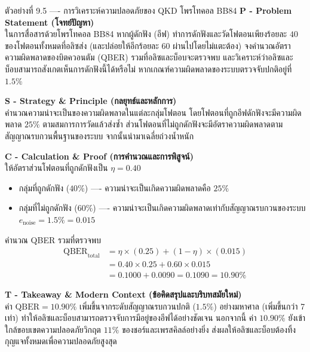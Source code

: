 \begin{psctbox}{ตัวอย่างที่ 9.5 ---- การวิเคราะห์ความปลอดภัยของ QKD โพรโทคอล BB84}
\noindent\textbf{P - Problem Statement (โจทย์ปัญหา)} \\
ในการสื่อสารด้วยโพรโทคอล BB84 หากผู้ดักฟัง (อีฟ) ทำการดักฟังและวัดโฟตอนเพียงร้อยละ $40$ ของโฟตอนทั้งหมดที่อลิซส่ง (และปล่อยให้อีกร้อยละ $60$ ผ่านไปโดยไม่แตะต้อง) จงคำนวณอัตราความผิดพลาดของบิตควอนตัม (QBER) รวมที่อลิซและบ็อบจะตรวจพบ และวิเคราะห์ว่าอลิซและบ็อบสามารถสังเกตเห็นการดักฟังนี้ได้หรือไม่ หากเกณฑ์ความผิดพลาดของระบบตรวจจับปกติอยู่ที่ $1.5\%$

\vspace{4pt}
\noindent\textbf{S - Strategy \& Principle (กลยุทธ์และหลักการ)} \\
คำนวณความน่าจะเป็นของความผิดพลาดในแต่ละกลุ่มโฟตอน โดยโฟตอนที่ถูกอีฟดักฟังจะมีความผิดพลาด $25\%$ ตามสมการการวัดแล้วส่งซ้ำ ส่วนโฟตอนที่ไม่ถูกดักฟังจะมีอัตราความผิดพลาดตามสัญญาณรบกวนพื้นฐานของระบบ จากนั้นนำมาเฉลี่ยถ่วงน้ำหนัก

\vspace{4pt}
\noindent\textbf{C - Calculation \& Proof (การคำนวณและการพิสูจน์)} \\
ให้อัตราส่วนโฟตอนที่ถูกดักฟังเป็น $\eta = 0.40$
\begin{itemize}
    \item กลุ่มที่ถูกดักฟัง ($40\%$) ---- ความน่าจะเป็นเกิดความผิดพลาดคือ $25\%$
    \item กลุ่มที่ไม่ถูกดักฟัง ($60\%$) ---- ความน่าจะเป็นเกิดความผิดพลาดเท่ากับสัญญาณรบกวนของระบบ $e_{\text{noise}} = 1.5\% = 0.015$
\end{itemize}
คำนวณ QBER รวมที่ตรวจพบ
\begin{align}
\text{QBER}_{\text{total}} &= \eta \times (0.25) + (1 - \eta) \times (0.015) \nonumber \\
&= 0.40 \times 0.25 + 0.60 \times 0.015 \nonumber \\
&= 0.1000 + 0.0090 = 0.1090 = 10.90\%
\end{align}

\vspace{4pt}
\noindent\textbf{T - Takeaway \& Modern Context (ข้อคิดสรุปและบริบทสมัยใหม่)} \\
ค่า $\text{QBER} = 10.90\%$ เพิ่มขึ้นจากระดับสัญญาณรบกวนปกติ ($1.5\%$) อย่างมหาศาล (เพิ่มขึ้นกว่า 7 เท่า) ทำให้อลิซและบ็อบสามารถตรวจจับการมีอยู่ของอีฟได้อย่างชัดเจน นอกจากนี้ ค่า $10.90\%$ ยังเข้าใกล้ขอบเขตความปลอดภัยวิกฤต $11\%$ ของชอร์และเพรสคิลล์อย่างยิ่ง ส่งผลให้อลิซและบ็อบต้องทิ้งกุญแจทั้งหมดเพื่อความปลอดภัยสูงสุด
\end{psctbox}

